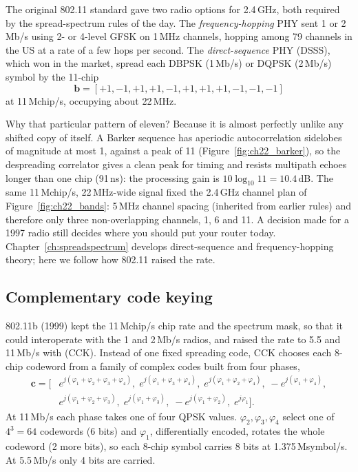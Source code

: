 The original 802.11 standard gave two radio options for 2.4\,GHz, both required by the
spread-spectrum rules of the day. The \emph{frequency-hopping} PHY sent 1 or 2\,Mb/s using 2- or
4-level GFSK on 1\,MHz channels, hopping among 79 channels in the US at a rate of a few hops per
second. The \emph{direct-sequence} PHY (DSSS), which won in the market, spread each DBPSK
(1\,Mb/s) or DQPSK (2\,Mb/s) symbol by the 11-chip 
\[
\mathbf{b}=[+1,-1,+1,+1,-1,+1,+1,+1,-1,-1,-1]
\]
at 11\,Mchip/s, occupying about 22\,MHz.

Why that particular pattern of eleven? Because it is almost perfectly unlike any shifted copy of
itself. A Barker sequence has aperiodic autocorrelation sidelobes of magnitude at most 1, against a
peak of 11 (Figure~\ref{fig:ch22_barker}), so the despreading correlator gives a clean peak for
timing and resists multipath echoes longer than one chip (91\,ns): the processing gain is
$10\log_{10}11=10.4$\,dB. The same 11\,Mchip/s, 22\,MHz-wide signal fixed the 2.4\,GHz channel plan
of Figure~\ref{fig:ch22_bands}: 5\,MHz channel spacing (inherited from earlier rules) and therefore
only three non-overlapping channels, 1, 6 and 11. A decision made for a 1997 radio still decides
where you should put your router today. Chapter~\ref{ch:spreadspectrum} develops direct-sequence
and frequency-hopping theory; here we follow how 802.11 raised the rate.


\subsection{Complementary code keying}

802.11b (1999) kept the 11\,Mchip/s chip rate and the spectrum mask, so that it could interoperate
with the 1 and 2\,Mb/s radios, and raised the rate to 5.5 and 11\,Mb/s with  (CCK). Instead of one fixed spreading code, CCK chooses each 8-chip codeword from a
family of complex codes built from four phases,
\begin{equation}
\begin{aligned}
\mathbf{c}=\big[&e^{j(\varphi_1+\varphi_2+\varphi_3+\varphi_4)},\;
e^{j(\varphi_1+\varphi_3+\varphi_4)},\;e^{j(\varphi_1+\varphi_2+\varphi_4)},\;
-e^{j(\varphi_1+\varphi_4)},\\
&e^{j(\varphi_1+\varphi_2+\varphi_3)},\;
e^{j(\varphi_1+\varphi_3)},\;-e^{j(\varphi_1+\varphi_2)},\;e^{j\varphi_1}\big].
\end{aligned}
\label{eq:ch22:cck}
\end{equation}
At 11\,Mb/s each phase takes one of four QPSK values. $\varphi_2,\varphi_3,\varphi_4$ select one of
$4^3=64$ codewords (6 bits) and $\varphi_1$, differentially encoded, rotates the whole codeword (2
more bits), so each 8-chip symbol carries 8 bits at 1.375\,Msymbol/s. At 5.5\,Mb/s only 4 bits are
carried.

